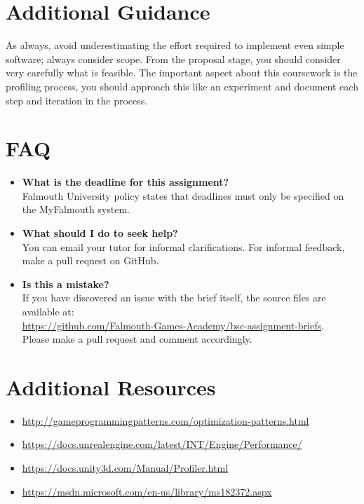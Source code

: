 \documentclass{../../fal_assignment}
\begin{document}
\section*{Additional Guidance}

As always, avoid underestimating the effort required to implement even simple software; always consider scope.
From the proposal stage, you should consider very carefully what is feasible. The important aspect about this coursework is the profiling process, you should approach this like an experiment and document each step and iteration in the process.



\section*{FAQ}

\begin{itemize}
	\item 	\textbf{What is the deadline for this assignment?} \\ 
    		Falmouth University policy states that deadlines must only be specified on the MyFalmouth system.
    		
	\item 	\textbf{What should I do to seek help?} \\ 
    		You can email your tutor for informal clarifications. For informal feedback, make a pull request on GitHub. 
    		
    	\item 	\textbf{Is this a mistake?} \\ 	
    		If you have discovered an issue with the brief itself, the source files are available at: \\
    		\url{https://github.com/Falmouth-Games-Academy/bsc-assignment-briefs}.\\
    		 Please make a pull request and comment accordingly.
\end{itemize}

\section*{Additional Resources}

\begin{itemize}
    \item \url{http://gameprogrammingpatterns.com/optimization-patterns.html}
    \item \url{https://docs.unrealengine.com/latest/INT/Engine/Performance/}
    \item \url{https://docs.unity3d.com/Manual/Profiler.html}
    \item \url{https://msdn.microsoft.com/en-us/library/ms182372.aspx}
\end{itemize}
\end{document}
